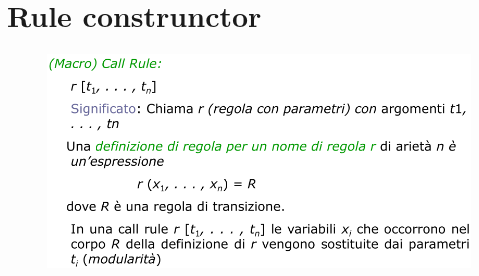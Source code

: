 \section{Rule construnctor}

\begin{figure}[H]
    \includegraphics[width=0.8\linewidth]{chapters/1-asm/images/call-rule.png}
\end{figure}







